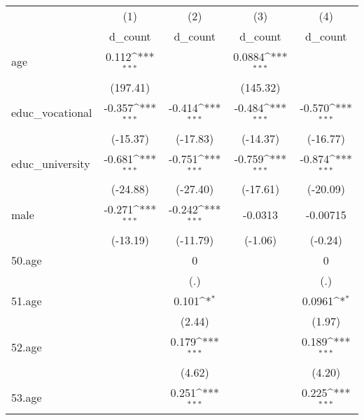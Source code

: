 {
\def\sym#1{\ifmmode^{#1}\else\(^{#1}\)\fi}
\begin{tabular}{l*{4}{c}}
\hline\hline
            &\multicolumn{1}{c}{(1)}&\multicolumn{1}{c}{(2)}&\multicolumn{1}{c}{(3)}&\multicolumn{1}{c}{(4)}\\
            &\multicolumn{1}{c}{d\_count}&\multicolumn{1}{c}{d\_count}&\multicolumn{1}{c}{d\_count}&\multicolumn{1}{c}{d\_count}\\
\hline
age         &       0.112\sym{***}&                     &      0.0884\sym{***}&                     \\
            &    (197.41)         &                     &    (145.32)         &                     \\
[1em]
educ\_vocational&      -0.357\sym{***}&      -0.414\sym{***}&      -0.484\sym{***}&      -0.570\sym{***}\\
            &    (-15.37)         &    (-17.83)         &    (-14.37)         &    (-16.77)         \\
[1em]
educ\_university&      -0.681\sym{***}&      -0.751\sym{***}&      -0.759\sym{***}&      -0.874\sym{***}\\
            &    (-24.88)         &    (-27.40)         &    (-17.61)         &    (-20.09)         \\
[1em]
male        &      -0.271\sym{***}&      -0.242\sym{***}&     -0.0313         &    -0.00715         \\
            &    (-13.19)         &    (-11.79)         &     (-1.06)         &     (-0.24)         \\
[1em]
50.age      &                     &           0         &                     &           0         \\
            &                     &         (.)         &                     &         (.)         \\
[1em]
51.age      &                     &       0.101\sym{*}  &                     &      0.0961\sym{*}  \\
            &                     &      (2.44)         &                     &      (1.97)         \\
[1em]
52.age      &                     &       0.179\sym{***}&                     &       0.189\sym{***}\\
            &                     &      (4.62)         &                     &      (4.20)         \\
[1em]
53.age      &                     &       0.251\sym{***}&                     &       0.225\sym{***}\\

\end{tabular}}
